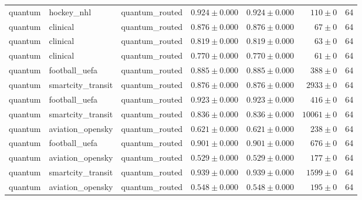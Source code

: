 \begin{table}[htbp]
\begin{tabular}{l l l r r r r}
quantum & hockey\_nhl & quantum\_routed & $0.924\pm0.000$ & $0.924\pm0.000$ & $110\pm0$ & 64 \\
quantum & clinical & quantum\_routed & $0.876\pm0.000$ & $0.876\pm0.000$ & $67\pm0$ & 64 \\
quantum & clinical & quantum\_routed & $0.819\pm0.000$ & $0.819\pm0.000$ & $63\pm0$ & 64 \\
quantum & clinical & quantum\_routed & $0.770\pm0.000$ & $0.770\pm0.000$ & $61\pm0$ & 64 \\
quantum & football\_uefa & quantum\_routed & $0.885\pm0.000$ & $0.885\pm0.000$ & $388\pm0$ & 64 \\
quantum & smartcity\_transit & quantum\_routed & $0.876\pm0.000$ & $0.876\pm0.000$ & $2933\pm0$ & 64 \\
quantum & football\_uefa & quantum\_routed & $0.923\pm0.000$ & $0.923\pm0.000$ & $416\pm0$ & 64 \\
quantum & smartcity\_transit & quantum\_routed & $0.836\pm0.000$ & $0.836\pm0.000$ & $10061\pm0$ & 64 \\
quantum & aviation\_opensky & quantum\_routed & $0.621\pm0.000$ & $0.621\pm0.000$ & $238\pm0$ & 64 \\
quantum & football\_uefa & quantum\_routed & $0.901\pm0.000$ & $0.901\pm0.000$ & $676\pm0$ & 64 \\
quantum & aviation\_opensky & quantum\_routed & $0.529\pm0.000$ & $0.529\pm0.000$ & $177\pm0$ & 64 \\
quantum & smartcity\_transit & quantum\_routed & $0.939\pm0.000$ & $0.939\pm0.000$ & $1599\pm0$ & 64 \\
quantum & aviation\_opensky & quantum\_routed & $0.548\pm0.000$ & $0.548\pm0.000$ & $195\pm0$ & 64 \\
\hline
\end{tabular}
\end{table}
